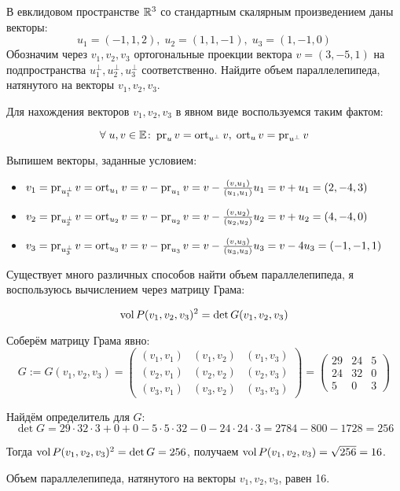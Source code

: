 \begin{condition}
    В евклидовом пространстве $\mathbb{R}^3$ со стандартным скалярным произведением даны векторы:
    \[
        u_1 = (-1, 1, 2), \;
        u_2 = (1, 1, -1), \;
        u_3 = (1, -1, 0)
    \]
    Обозначим через $v_1, v_2, v_3$ ортогональные проекции вектора $v = (3, -5, 1)$ на подпространства $u_1^\bot, u_2^\bot, u_3^\bot$ соответственно. Найдите объем параллелепипеда, натянутого на векторы $v_1, v_2, v_3$.
\end{condition}

Для нахождения векторов $v_1, v_2, v_3$ в явном виде воспользуемся таким фактом:
\begin{theorem}
    \[
        \forall \; u, v \in \mathbb{E} \colon \operatorname{pr}_u v = \operatorname{ort}_{u^\bot} v, \; \operatorname{ort}_u v = \operatorname{pr}_{u^\bot} v
    \]
\end{theorem}

Выпишем векторы, заданные условием:
\begin{itemize}
    \item $v_1 = \operatorname{pr}_{u_1^\bot} v = \operatorname{ort}_{u_1} v = v - \operatorname{pr}_{u_1} v = v - \frac{(v, u_1)}{(u_1, u_1)} u_1 = v + u_1 = (2, -4, 3)$

    \item $v_2 = \operatorname{pr}_{u_2^\bot} v = \operatorname{ort}_{u_2} v = v - \operatorname{pr}_{u_2} v = v - \frac{(v, u_2)}{(u_2, u_2)} u_2 = v + u_2 = (4, -4, 0)$

    \item $v_3 = \operatorname{pr}_{u_3^\bot} v = \operatorname{ort}_{u_3} v = v - \operatorname{pr}_{u_3} v = v - \frac{(v, u_3)}{(u_3, u_3)} u_3 = v - 4 u_3 = (-1, -1, 1)$
\end{itemize}

Существует много различных способов найти объем параллелепипеда, я воспользуюсь вычислением через матрицу Грама:
\begin{theorem}
    \[
        \operatorname{vol} P(v_1, v_2, v_3)^2 = \det G(v_1, v_2, v_3)
    \]
\end{theorem}

Соберём матрицу Грама явно:
\[
    G := G(v_1, v_2, v_3)
    =
    \begin{pmatrix}
        (v_1, v_1) & (v_1, v_2) & (v_1, v_3) \\
        (v_2, v_1) & (v_2, v_2) & (v_2, v_3) \\
        (v_3, v_1) & (v_3, v_2) & (v_3, v_3)
    \end{pmatrix}
    =
    \begin{pmatrix}
        29 & 24 & 5 \\
        24 & 32 & 0 \\
        5  & 0  & 3
    \end{pmatrix}
\]

Найдём определитель для $G$:
\[
    \det G =
    29 \cdot 32 \cdot 3 + 0 + 0 - 5 \cdot 5 \cdot 32 - 0 - 24 \cdot 24 \cdot 3 = 2784 - 800 - 1728 = 256
\]

Тогда $\operatorname{vol} P(v_1, v_2, v_3)^2 = \det G = 256$, получаем $\operatorname{vol} P(v_1, v_2, v_3) = \sqrt{256} = 16$.

Объем параллелепипеда, натянутого на векторы $v_1, v_2, v_3$, равен 16.
